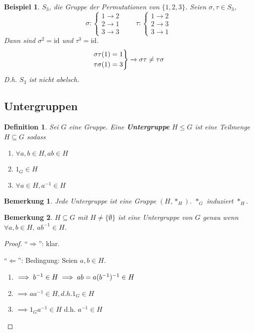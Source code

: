 \documentclass{article}
\theoremstyle{plain}
\newtheorem{definition}{Definition}
\newtheorem{beispiel}{Beispiel}
\newtheorem{bemerkung}{Bemerkung}
\newcommand{\defn}[1]{\textbf{#1}}
\newcommand{\id}{\mathrm{id}}
\begin{document}
\begin{beispiel}
    $S_3$, die Gruppe der Permutationen von $\{1,2,3\}$.
    Seien $\sigma, \tau\in S_3$,
    $$
        \sigma\colon\begin{cases}
            1\to 2\\
            2\to 1\\
            3\to 3
        \end{cases}
        \qquad \tau\colon\begin{cases}
            1\to 2\\
            2\to 3\\
            3\to 1
        \end{cases}
    $$
    Dann sind $\sigma^2 = \id$ und $\tau^3 = \id$.
    $$\begin{rcases}
        \sigma\tau(1) = 1\\
        \tau\sigma(1) = 3
    \end{rcases} \xrightarrow{} \sigma\tau \neq \tau\sigma $$
    D.h. $S_3$ ist nicht abelsch.
\end{beispiel}

\subsection*{Untergruppen}
\begin{definition}
    Sei $G$ eine Gruppe. Eine \defn{Untergruppe} $H\leq G$ ist eine Teilmenge $H\subseteq G$ sodass 
    \begin{enumerate}[label=(\alph*)]
        \item $\forall a,b \in H, ab\in H$
        \item $1_G \in H$
        \item $\forall a\in H, a^{-1}\in H$
    \end{enumerate}
\end{definition}
\begin{bemerkung}
    Jede Untergruppe ist eine Gruppe $(H, *_H)$. $*_G$ induziert $*_H$.
\end{bemerkung}
\begin{bemerkung}
    $H \subseteq G$ mit $H\neq \{\emptyset\}$ ist eine Untergruppe von $G$ genau wenn $\forall a,b\in H,\ ab^{-1}\in H$.
\end{bemerkung}
\begin{proof}
    ``$\Rightarrow$'': klar.
    
    ``$\Leftarrow$'': Bedingung: Seien $a,b\in H$.
    \begin{enumerate}[label=(\alph*)]
            \item $\implies b^{-1}\in H\\\implies ab=a(b^{-1})^{-1}\in H$
            \item $\implies aa^{-1}\in H, d.h. 1_G\in H$
            \item $\implies 1_G a^{-1}\in H$ d.h. $a^{-1}\in H$
    \end{enumerate}    
\end{proof}
\end{document}
